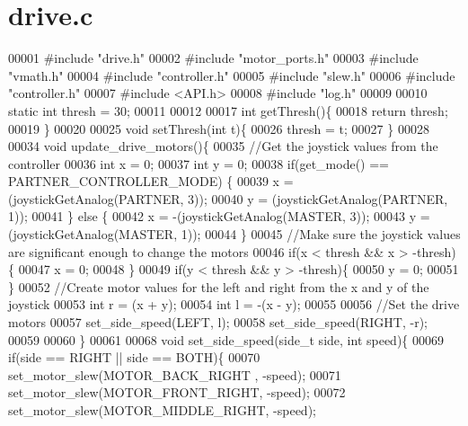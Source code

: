 \section{drive.\+c}
\label{drive_8c_source}

\begin{DoxyCode}
00001 \textcolor{preprocessor}{#include "drive.h"}
00002 \textcolor{preprocessor}{#include "motor_ports.h"}
00003 \textcolor{preprocessor}{#include "vmath.h"}
00004 \textcolor{preprocessor}{#include "controller.h"}
00005 \textcolor{preprocessor}{#include "slew.h"}
00006 \textcolor{preprocessor}{#include "controller.h"}
00007 \textcolor{preprocessor}{#include <API.h>}
00008 \textcolor{preprocessor}{#include "log.h"}
00009 
00010 \textcolor{keyword}{static} \textcolor{keywordtype}{int} thresh = 30;
00011 
00012 
00017 \textcolor{keywordtype}{int} getThresh()\{
00018   \textcolor{keywordflow}{return} thresh;
00019 \}
00020 
00025 \textcolor{keywordtype}{void} setThresh(\textcolor{keywordtype}{int} t)\{
00026   thresh = t;
00027 \}
00028 
00034 \textcolor{keywordtype}{void} update_drive_motors()\{
00035   \textcolor{comment}{//Get the joystick values from the controller}
00036   \textcolor{keywordtype}{int} x = 0;
00037   \textcolor{keywordtype}{int} y = 0;
00038   \textcolor{keywordflow}{if}(get_mode() == PARTNER_CONTROLLER_MODE) \{
00039     x = (joystickGetAnalog(PARTNER, 3));
00040     y = (joystickGetAnalog(PARTNER, 1));
00041   \} \textcolor{keywordflow}{else} \{
00042     x = -(joystickGetAnalog(MASTER, 3));
00043     y = (joystickGetAnalog(MASTER, 1));
00044   \}
00045   \textcolor{comment}{//Make sure the joystick values are significant enough to change the motors}
00046   \textcolor{keywordflow}{if}(x < thresh && x > -thresh)\{
00047     x = 0;
00048   \}
00049   \textcolor{keywordflow}{if}(y < thresh && y > -thresh)\{
00050     y = 0;
00051   \}
00052   \textcolor{comment}{//Create motor values for the left and right from the x and y of the joystick}
00053   \textcolor{keywordtype}{int} r = (x + y);
00054   \textcolor{keywordtype}{int} l = -(x - y);
00055 
00056   \textcolor{comment}{//Set the drive motors}
00057   set_side_speed(LEFT, l);
00058   set_side_speed(RIGHT, -r);
00059 
00060 \}
00061 
00068 \textcolor{keywordtype}{void} set_side_speed(side_t side, \textcolor{keywordtype}{int} speed)\{
00069   \textcolor{keywordflow}{if}(side == RIGHT || side == BOTH)\{
00070     set_motor_slew(MOTOR_BACK_RIGHT , -speed);
00071     set_motor_slew(MOTOR_FRONT_RIGHT, -speed);
00072     set_motor_slew(MOTOR_MIDDLE_RIGHT, -speed);

\end{DoxyCode}
